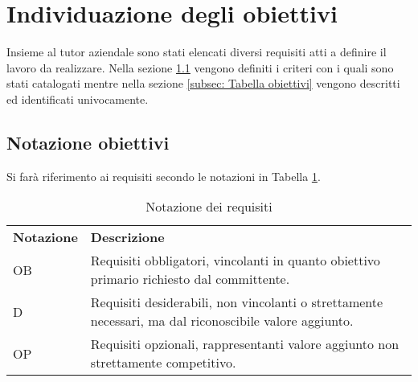 \section{Individuazione degli obiettivi}
Insieme al tutor aziendale sono stati elencati diversi requisiti atti a definire il lavoro da realizzare. Nella sezione \ref{subsec: Notazione obiettivi} vengono definiti i criteri con i quali sono stati catalogati mentre nella sezione \ref{subsec: Tabella obiettivi} vengono descritti ed identificati univocamente.
\subsection{Notazione obiettivi} \label{subsec: Notazione obiettivi}
Si farà riferimento ai requisiti secondo le notazioni in Tabella \ref{tab:notazione-requisiti}.
\begin{longtable}{|p{}|p{}|}
	\caption{Notazione dei requisiti}
	\label{tab:notazione-requisiti} \\
	\hline
    \textbf{Notazione}	&	\textbf{Descrizione} \\
    OB			&	Requisiti obbligatori, vincolanti in quanto obiettivo primario richiesto dal committente. \\  
	\hline
    D			&	Requisiti desiderabili, non vincolanti o strettamente necessari, ma dal riconoscibile valore aggiunto. \\ 
	\hline
    OP			&	Requisiti opzionali, rappresentanti valore aggiunto non strettamente competitivo. \\
    \hline
\end{longtable}%

